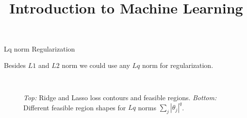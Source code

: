 \documentclass[11pt,compress,t,notes=noshow, xcolor=table]{beamer}
\title{Introduction to Machine Learning}
\date{}
\begin{document}

\begin{vbframe}{Lq norm Regularization} 

Besides $L1$ and $L2$ norm we could use any $Lq$ norm for regularization.

\begin{figure}
  \\
\caption{\textit{Top:} Ridge and Lasso loss contours and feasible regions.
  \textit{Bottom:} Different feasible region shapes for $Lq$ norms $\sum_j |\theta_j|^q$.}
\end{figure}
  
\end{vbframe}
\end{document}
